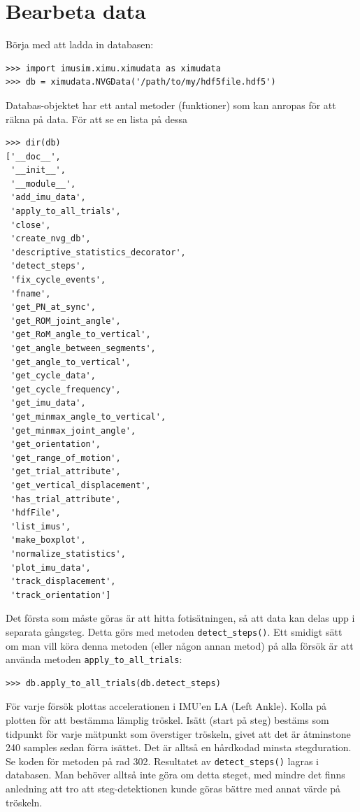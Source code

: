 \documentclass[captions=tableheading]{scrartcl}
\begin{document}
\section{Bearbeta data}
\label{sec-6}
Börja med att ladda in databasen:
\begin{verbatim}
>>> import imusim.ximu.ximudata as ximudata
>>> db = ximudata.NVGData('/path/to/my/hdf5file.hdf5')
\end{verbatim}
Databas-objektet har ett antal metoder (funktioner) som kan anropas för att räkna på data. För att se en lista på dessa
\begin{verbatim}
>>> dir(db)
['__doc__',
 '__init__',
 '__module__',
 'add_imu_data',
 'apply_to_all_trials',
 'close',
 'create_nvg_db',
 'descriptive_statistics_decorator',
 'detect_steps',
 'fix_cycle_events',
 'fname',
 'get_PN_at_sync',
 'get_ROM_joint_angle',
 'get_RoM_angle_to_vertical',
 'get_angle_between_segments',
 'get_angle_to_vertical',
 'get_cycle_data',
 'get_cycle_frequency',
 'get_imu_data',
 'get_minmax_angle_to_vertical',
 'get_minmax_joint_angle',
 'get_orientation',
 'get_range_of_motion',
 'get_trial_attribute',
 'get_vertical_displacement',
 'has_trial_attribute',
 'hdfFile',
 'list_imus',
 'make_boxplot',
 'normalize_statistics',
 'plot_imu_data',
 'track_displacement',
 'track_orientation']
\end{verbatim}
Det första som måste göras är att hitta fotisätningen, så att data kan delas upp i separata gångsteg. Detta görs med metoden \texttt{detect\_steps()}. Ett smidigt sätt om man vill köra denna metoden (eller någon annan metod) på alla försök är att använda metoden \texttt{apply\_to\_all\_trials}:
\begin{verbatim}
>>> db.apply_to_all_trials(db.detect_steps)
\end{verbatim}
För varje försök plottas accelerationen i IMU'en LA (Left Ankle). Kolla på plotten för att bestämma lämplig tröskel. Isätt (start på steg) bestäms som tidpunkt för varje mätpunkt som överstiger tröskeln, givet att det är åtminstone 240 samples sedan förra isättet. Det är alltså en hårdkodad minsta stegduration. Se koden för metoden på rad 302. Resultatet av \texttt{detect\_steps()} lagras i databasen. Man behöver alltså inte göra om detta steget, med mindre det finns anledning att tro att steg-detektionen kunde göras bättre med annat värde på tröskeln.
\end{document}
